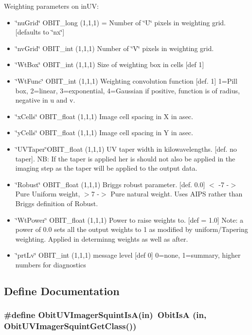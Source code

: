 Weighting parameters on in\-UV: \begin{itemize}
\item \char`\"{}nu\-Grid\char`\"{} OBIT\_\-long (1,1,1) = Number of \char`\"{}U\char`\"{} pixels in weighting grid. [defaults to \char`\"{}nx\char`\"{}] \item \char`\"{}nv\-Grid\char`\"{} OBIT\_\-int (1,1,1) Number of \char`\"{}V\char`\"{} pixels in weighting grid. \item \char`\"{}Wt\-Box\char`\"{} OBIT\_\-int (1,1,1) Size of weighting box in cells [def 1] \item \char`\"{}Wt\-Func\char`\"{} OBIT\_\-int (1,1,1) Weighting convolution function [def. 1] 1=Pill box, 2=linear, 3=exponential, 4=Gaussian if positive, function is of radius, negative in u and v. \item \char`\"{}x\-Cells\char`\"{} OBIT\_\-float (1,1,1) Image cell spacing in X in asec. \item \char`\"{}y\-Cells\char`\"{} OBIT\_\-float (1,1,1) Image cell spacing in Y in asec. \item \char`\"{}UVTaper\char`\"{}OBIT\_\-float (1,1,1) UV taper width in kilowavelengths. [def. no taper]. NB: If the taper is applied her is should not also be applied in the imaging step as the taper will be applied to the output data. \item \char`\"{}Robust\char`\"{} OBIT\_\-float (1,1,1) Briggs robust parameter. [def. 0.0] $<$ -7 -$>$ Pure Uniform weight, $>$7 -$>$ Pure natural weight. Uses AIPS rather than Briggs definition of Robust. \item \char`\"{}Wt\-Power\char`\"{} OBIT\_\-float (1,1,1) Power to raise weights to. [def = 1.0] Note: a power of 0.0 sets all the output weights to 1 as modified by uniform/Tapering weighting. Applied in determinng weights as well as after. \item \char`\"{}prt\-Lv\char`\"{} OBIT\_\-int (1,1,1) message level [def 0] 0=none, 1=summary, higher numbers for diagnostics\end{itemize}


\subsection{Define Documentation}
\subsubsection{\setlength{\rightskip}{0pt plus 5cm}\#define Obit\-UVImager\-Squint\-Is\-A(in)\ Obit\-Is\-A (in, Obit\-UVImager\-Squint\-Get\-Class())}\label{ObitUVImagerSquint_8h_a2}


